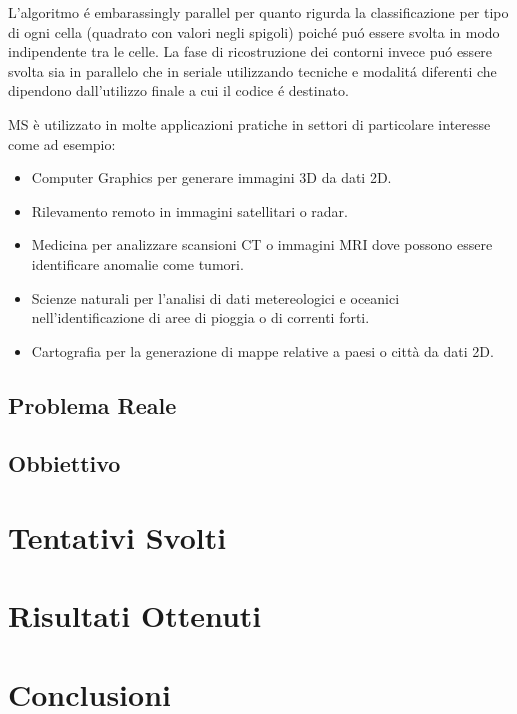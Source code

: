 \documentclass[12pt,a4paper]{report}
\begin{document}
L'algoritmo é embarassingly parallel per quanto rigurda la classificazione per tipo di ogni cella (quadrato con valori negli spigoli) poiché puó essere svolta in modo indipendente tra le celle. \newline
La fase di ricostruzione dei contorni invece puó essere svolta sia in parallelo che in seriale utilizzando tecniche e modalitá diferenti che dipendono dall'utilizzo finale a cui il codice é destinato. \newline

MS è utilizzato in molte applicazioni pratiche in settori di particolare interesse come ad esempio:
\begin{itemize}
\item Computer Graphics per generare immagini 3D da dati 2D.
\item Rilevamento remoto in immagini satellitari o radar.
\item Medicina per analizzare scansioni CT o immagini MRI dove possono essere identificare anomalie come tumori.
\item Scienze naturali per l'analisi di dati metereologici e oceanici nell'identificazione di aree di pioggia o di correnti forti.
\item Cartografia per la generazione di mappe relative a paesi o città da dati 2D.
\end{itemize}

\section{Problema Reale}


\section{Obbiettivo}





\chapter{Tentativi Svolti}


\chapter{Risultati Ottenuti}

\chapter{Conclusioni}
\end{document}
